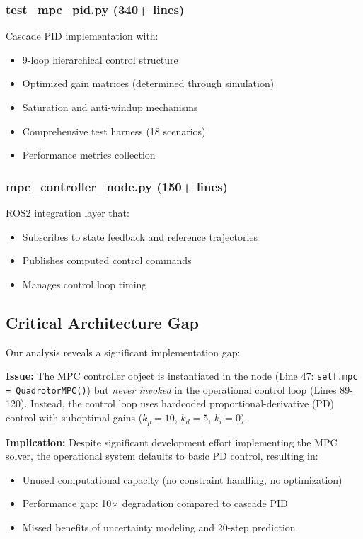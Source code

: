 \documentclass[journal]{IEEEtran}
\begin{document}
\subsubsection{test\_mpc\_pid.py (340+ lines)}

Cascade PID implementation with:
\begin{itemize}
    \item 9-loop hierarchical control structure
    \item Optimized gain matrices (determined through simulation)
    \item Saturation and anti-windup mechanisms
    \item Comprehensive test harness (18 scenarios)
    \item Performance metrics collection
\end{itemize}

\subsubsection{mpc\_controller\_node.py (150+ lines)}

ROS2 integration layer that:
\begin{itemize}
    \item Subscribes to state feedback and reference trajectories
    \item Publishes computed control commands
    \item Manages control loop timing
\end{itemize}

\subsection{Critical Architecture Gap}

Our analysis reveals a significant implementation gap:

\textbf{Issue:} The MPC controller object is instantiated in the node (Line 47: \texttt{self.mpc = QuadrotorMPC()}) but \textit{never invoked} in the operational control loop (Lines 89-120). Instead, the control loop uses hardcoded proportional-derivative (PD) control with suboptimal gains ($k_p = 10$, $k_d = 5$, $k_i = 0$).

\textbf{Implication:} Despite significant development effort implementing the MPC solver, the operational system defaults to basic PD control, resulting in:
\begin{itemize}
    \item Unused computational capacity (no constraint handling, no optimization)
    \item Performance gap: 10$\times$ degradation compared to cascade PID
    \item Missed benefits of uncertainty modeling and 20-step prediction
\end{itemize}
\end{document}

